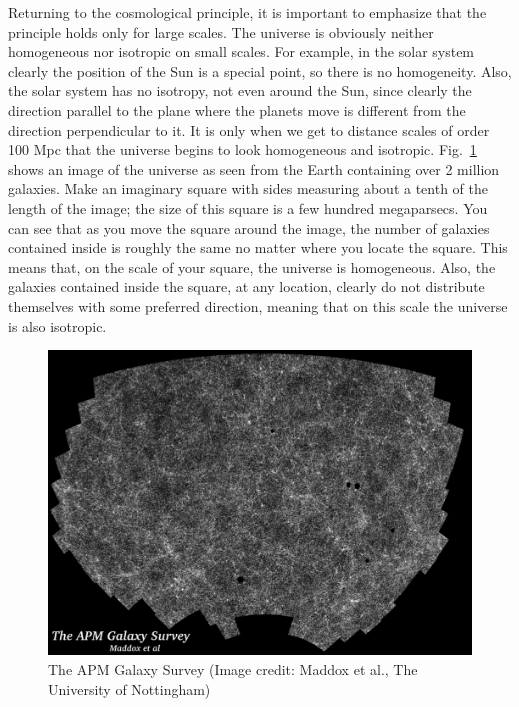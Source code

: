 \documentclass[11pt, a4paper,oneside,openright]{book}
\numberwithin{equation}{section}
\begin{document}
Returning to the cosmological principle, it is important to emphasize that the principle holds only for large scales. The universe is obviously neither homogeneous nor isotropic on small scales. For example, in the solar system clearly the position of the Sun is a special point, so there is no homogeneity. Also, the solar system has no isotropy, not even around the Sun, since clearly the direction parallel to the plane where the planets move is different from the direction perpendicular to it. It is only when we get to distance scales of order 100 Mpc that the universe begins to look homogeneous and isotropic. Fig.\ \ref{fig:lec4_5} shows an image of the universe as seen from the Earth containing over 2 million galaxies. Make an imaginary square with sides measuring about a tenth of the length of the image; the size of this square is a few hundred megaparsecs. You can see that as you move the square around the image, the number of galaxies contained inside is roughly the same no matter where you locate the 
square. This means that, on the scale of your square, the universe is homogeneous. Also, the galaxies contained inside the square, at any location, clearly do not distribute themselves with some preferred direction, meaning that on this scale the universe is also isotropic.
\begin{figure}[ht]
\begin{center}
\includegraphics[scale=0.4]{Draw/lec4_5.png}
\end{center}
\caption{The APM Galaxy Survey (Image credit: Maddox et al., The University of Nottingham)}
\label{fig:lec4_5}
\end{figure}
\end{document}

